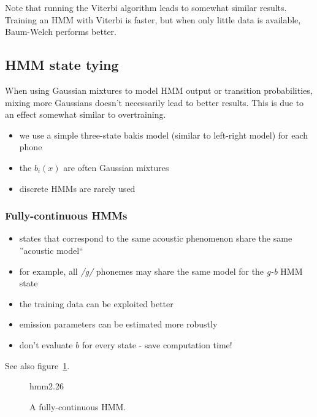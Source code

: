 \documentclass[11pt]{article}
\begin{document}
Note that running the Viterbi algorithm leads to somewhat similar results. Training an HMM with Viterbi is faster, but when only little data is available, Baum-Welch performs better.

\subsection{HMM state tying}

When using Gaussian mixtures to model HMM output or transition probabilities, mixing more Gaussians doesn't necessarily lead to better results. This is due to an effect somewhat similar to overtraining.

\begin{itemize}
    \item we use a simple three-state bakis model (similar to left-right model) for each phone
    \item the $b_i(x)$ are often Gaussian mixtures
    \item discrete HMMs are rarely used
\end{itemize}

\subsubsection{Fully-continuous HMMs}
\begin{itemize}
    \item states that correspond to the same acoustic phenomenon share the same ''acoustic model``
    \item for example, all \textit{/g/} phonemes may share the same model for the \textit{g-b} HMM state
    \item the training data can be exploited better
    \item emission parameters can be estimated more robustly
    \item don't evaluate $b$ for every state - save computation time!
\end{itemize}
See also figure~\ref{fig:fullyContinuousHMMs}.
\begin{figure}[htb]
    \begin{minipage}{\linewidth}
        \vspace{6cm}
        \hfill \scriptsize hmm2.26
    \end{minipage}
    \caption{\label{fig:fullyContinuousHMMs} A fully-continuous HMM.}
\end{figure}
\end{document}
